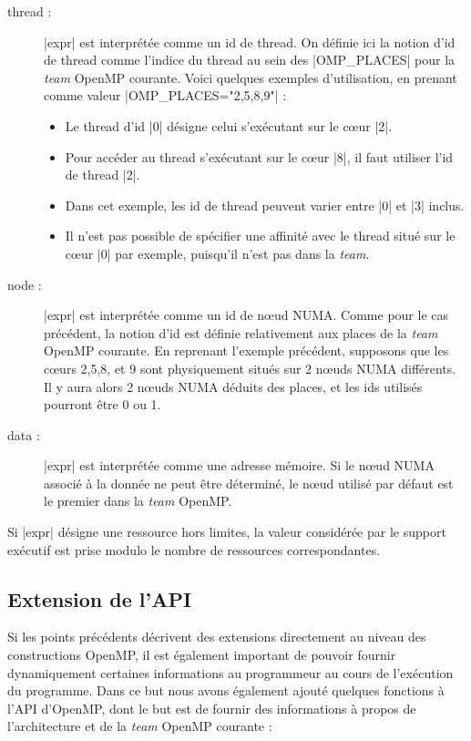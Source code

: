 \begin{description}
  \item [thread :]
    |expr| est interprétée comme un id de thread. On définie ici la notion d'id de thread comme l'indice du thread au sein des |OMP_PLACES| pour la \textit{team} OpenMP courante.
    Voici quelques exemples d'utilisation, en prenant comme valeur |OMP_PLACES="{2},{5},{8},{9}"| :
    \begin{itemize}
      \item Le thread d'id |0| désigne celui s'exécutant sur le cœur |2|.
      \item Pour accéder au thread s'exécutant sur le cœur |8|, il faut utiliser l'id de thread |2|.
      \item Dans cet exemple, les id de thread peuvent varier entre |0| et |3| inclus.
      \item Il n'est pas possible de spécifier une affinité avec le thread situé sur le cœur |0| par exemple, puisqu'il n'est pas dans la \emph{team}.
    \end{itemize}
  \item [node :]
    |expr| est interprétée comme un id de nœud NUMA. Comme pour le cas précédent, la notion d'id est définie relativement aux places de la \textit{team} OpenMP courante.
    En reprenant l'exemple précédent, supposons que les cœurs 2,5,8, et 9 sont physiquement situés sur 2 nœuds NUMA différents. Il y aura alors 2 nœuds NUMA déduits des places, et les ids utilisés pourront être 0 ou 1.
  \item [data :]
    |expr| est interprétée comme une adresse mémoire. Si le nœud NUMA associé à la donnée ne peut être déterminé, le nœud utilisé par défaut est le premier dans la \textit{team} OpenMP.
\end{description}

Si |expr| désigne une ressource hors limites, la valeur considérée par le support exécutif est prise modulo le nombre de ressources correspondantes.

\subsection{Extension de l'API}

Si les points précédents décrivent des extensions directement au niveau des constructions OpenMP, il est également important de pouvoir fournir dynamiquement certaines informations au programmeur au cours de l'exécution du programme.
Dans ce but nous avons également ajouté quelques fonctions à l'API d'OpenMP, dont le but est de fournir des informations à propos de l'architecture et de la \emph{team} OpenMP courante :

